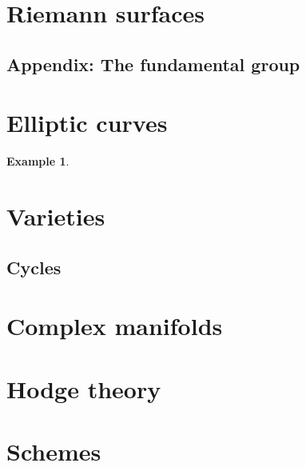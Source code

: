 \documentclass[10pt]{article}
\theoremstyle{definition}
\newtheorem{exam}[theo]{Example}
\begin{document}
\section{Riemann surfaces}
\label{ch:7}

\subsection{Appendix: The fundamental group}
\label{ch:7.8}

\section{Elliptic curves}
\label{ch:8}

\begin{exam}
\label{8.3.2}
\end{exam}

\section{Varieties}
\label{ch:9}

\subsection{Cycles}
\label{ch:9.11}


\section{Complex manifolds}
\label{ch:10}

\section{Hodge theory}
\label{ch:11}

\section{Schemes}
\label{ch:12}







\end{document}
